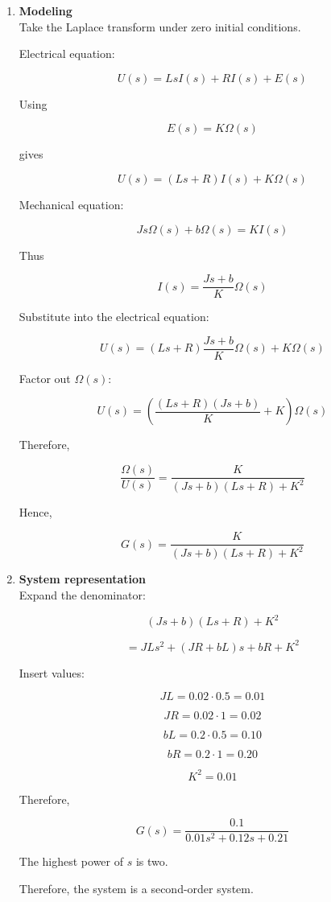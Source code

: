 \documentclass[a4paper,12pt]{article}
\begin{document}
\begin{enumerate}

\item[(a)] \textbf{Modeling}~\\

Take the Laplace transform under zero initial conditions.

Electrical equation:

\[
U(s)=LsI(s)+RI(s)+E(s)
\]

Using

\[
E(s)=K\Omega(s)
\]

gives

\[
U(s)=(Ls+R)I(s)+K\Omega(s)
\]

Mechanical equation:

\[
Js\Omega(s)+b\Omega(s)=KI(s)
\]

Thus

\[
I(s)=\frac{Js+b}{K}\Omega(s)
\]

Substitute into the electrical equation:

\[
U(s)
=
(Ls+R)\frac{Js+b}{K}\Omega(s)
+
K\Omega(s)
\]

Factor out $\Omega(s)$:

\[
U(s)
=
\left(
\frac{(Ls+R)(Js+b)}{K}
+
K
\right)
\Omega(s)
\]

Therefore,

\[
\frac{\Omega(s)}{U(s)}
=
\frac{K}
{(Js+b)(Ls+R)+K^2}
\]

Hence,

\[
G(s)
=
\frac{K}
{(Js+b)(Ls+R)+K^2}
\]

\item[(b)] \textbf{System representation}~\\

Expand the denominator:

\[
(Js+b)(Ls+R)+K^2
\]

\[
=
JLs^2+(JR+bL)s+bR+K^2
\]

Insert values:

\[
JL=0.02\cdot0.5=0.01
\]

\[
JR=0.02\cdot1=0.02
\]

\[
bL=0.2\cdot0.5=0.10
\]

\[
bR=0.2\cdot1=0.20
\]

\[
K^2=0.01
\]

Therefore,

\[
G(s)
=
\frac{0.1}
{0.01s^2+0.12s+0.21}
\]

The highest power of $s$ is two.

Therefore, the system is a second-order system.


\end{enumerate}
\end{document}
